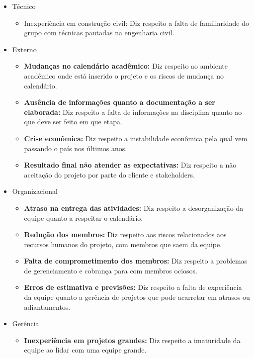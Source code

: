 \begin{itemize}
  \item Técnico
    \begin{itemize}
      \item Inexperiência em construção civil: Diz respeito a falta de familiaridade do grupo com técnicas pautadas na engenharia civil.
    \end{itemize}
  \item Externo
  \begin{itemize}
    \item \textbf{Mudanças no calendário acadêmico:} Diz respeito ao ambiente acadêmico onde está inserido o projeto e os riscos de mudança no calendário.
    \item \textbf{Ausência de informações quanto a documentação a ser elaborada:} Diz respeito a falta de informações na disciplina quanto ao que deve ser feito em que etapa.
    \item \textbf{Crise econômica:} Diz respeito a instabilidade econômica pela qual vem passando o país nos últimos anos.
    \item \textbf{Resultado final não atender as expectativas:} Diz respeito a não aceitação do projeto por parte do cliente e stakeholders.
  \end{itemize}


  \item Organizacional
  \begin{itemize}
    \item \textbf{Atraso na entrega das atividades:} Diz respeito a desorganização da equipe quanto a respeitar o calendário.
    \item \textbf{Redução dos membros:} Diz respeito aos riscos relacionados aos recursos humanos do projeto, com membros que saem da equipe.
    \item \textbf{Falta de comprometimento dos membros:} Diz respeito a problemas de gerenciamento e cobrança para com membros ociosos.
    \item \textbf{Erros de estimativa e previsões:} Diz respeito a falta de experiência da equipe quanto a gerência de projetos que pode acarretar em atrasos ou adiantamentos.
  \end{itemize}

  \item Gerência
  \begin{itemize}
    \item \textbf{Inexperiência em projetos grandes:} Diz respeito a imaturidade da equipe ao lidar com uma equipe grande.
  \end{itemize}

\end{itemize}

